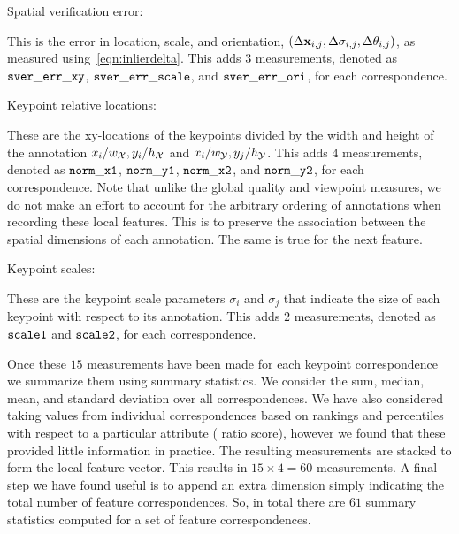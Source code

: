 \begin{itemln}
    \item Spatial verification error:

        This is the error in location, scale, and orientation, $( %
            \Delta \pt_{i, j}, %
            \Delta \scale_{i, j}, %
            \Delta \ori_{i, j})$, as measured using~\cref{eqn:inlierdelta}.
            This adds $3$ measurements, denoted as $\tt{sver\_err\_xy}$, $\tt{sver\_err\_scale}$, and
              $\tt{sver\_err\_ori}$, for each correspondence.

    \item Keypoint relative locations:

        These are the xy-locations of the keypoints divided by the width and height of the annotation  %
        $x_i / w_{\mathcal{X}}, y_i / h_{\mathcal{X}}$ and $x_i / w_{\mathcal{Y}}, y_j / h_{\mathcal{Y}}$.
        This adds $4$ measurements, denoted as $\tt{norm\_x1}$, $\tt{norm\_y1}$, $\tt{norm\_x2}$, and
          $\tt{norm\_y2}$, for each correspondence.
        Note that unlike the global quality and viewpoint measures, we do not make an effort to account for the
          arbitrary ordering of annotations when recording these local features.
        This is to preserve the association between the spatial dimensions of each annotation.
        The same is true for the next feature.

    \item Keypoint scales:

        These are the keypoint scale parameters $\sigma_i$ and $\sigma_j$ that indicate the size of each keypoint
          with respect to its annotation.
        This adds $2$ measurements, denoted as $\tt{scale1}$ and $\tt{scale2}$, for each correspondence.

\end{itemln}

Once these $15$ measurements have been made for each keypoint correspondence we summarize them using summary
  statistics.
We consider the sum, median, mean, and standard deviation over all correspondences.
We have also considered taking values from individual correspondences based on rankings and percentiles with
  respect to a particular attribute (\eg{} ratio score), however we found that these provided little information in
  practice.
The resulting measurements are stacked to form the local feature vector.
This results in $15 \times 4 = 60$ measurements.
A final step we have found useful is to append an extra dimension simply indicating the total number of feature
  correspondences.
So, in total there are $61$ summary statistics computed for a set of feature correspondences.

